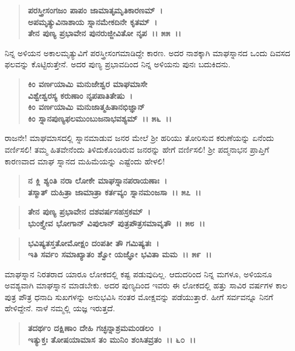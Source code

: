 \begin{verse}
\textbf{ಪರಸ್ತ್ರೀಸಂಗಜಂ ಪಾಪಂ ಜಾಮಾತೃಮೃತಿಕಾರಣಮ್~।}\\\textbf{ಅಪಮೃತ್ಯುವಿನಾಶಾಯ ಸ್ನಾನಮೇಕದಿನೇ ಕೃತಮ್~। }\\\textbf{ತೇನ ಪುಣ್ಯ ಪ್ರಭಾವೇನ ಪುನರುಜ್ಜೀವಿತೋ ನೃಪ~।। ೫೫~।।}
\end{verse}

ನಿನ್ನ ಅಳಿಯನ ಅಕಾಲಮೃತ್ಯುವಿಗೆ ಪರಸ್ತ್ರೀಸಂಗಮಾಡಿದ್ದೇ ಕಾರಣ. ಅದರ ನಾಶಕ್ಕಾಗಿ ಮಾಘಸ್ನಾನದ ಒಂದು ದಿವಸದ ಫಲವನ್ನು ಕೊಟ್ಟಿರುತ್ತೇನೆ. ಅದರ ಪುಣ್ಯ ಪ್ರಭಾವದಿಂದ ನಿನ್ನ ಅಳಿಯನು ಪುನಃ ಬದುಕಿದನು.

\begin{verse}
\textbf{ಕಿಂ ವರ್ಣಯಾಮಿ ಮನುಜೇಶ್ವರ ಮಾಘಮಾಸೇ}\\\textbf{ವಿಶ್ವೇಶ್ವರಸ್ಯ ಕರುಣಾಂ ನೃಪಪಾತಿತೇಷು~। }\\\textbf{ಕಿಂ ವರ್ಣಯಾಮಿ ಮನುಜಾತ್ಮಹಿತಾನಭಿಜ್ಞಾನ್} \\\textbf{ಕಿಂ ಸ್ನಾನಪುಣ್ಯಫಲಮುಂಬುಜನಾಭವಶ್ಯಮ್~।। ೫೬~।।}
\end{verse}

ರಾಜನೇ! ಮಾಘಮಾಸದಲ್ಲಿ ಸ್ನಾನಮಾಡುವ ಜನರ ಮೇಲೆ ಶ‍್ರೀ ಹರಿಯು ತೋರಿಸುವ ಕರುಣೆಯನ್ನು ಏನೆಂದು ವರ್ಣಿಸಲಿ! ತಮ್ಮ ಹಿತವೇನೆಂದು ತಿಳಿದುಕೊಂಡಿರುವ ಜನರನ್ನು ಹೇಗೆ ವರ್ಣಿಸಲಿ! ಶ‍್ರೀ ಪದ್ಮನಾಭನ ಪ್ರಾಪ್ತಿಗೆ ಕಾರಣವಾದ ಮಾಘ ಸ್ನಾನದ ಮಹಿಮೆಯನ್ನು ಎಷ್ಟೆಂದು ಹೇಳಲಿ!

\begin{verse}
\textbf{ನ ಕ್ಲಿ ಶ್ಯಂತಿ ನರಾ ಲೋಕೇ ಮಾಘಸ್ನಾನಪರಾಯಣಾಃ~।}\\\textbf{ತಸ್ಮಾತ್ ದುಹಿತ್ರಾ ಜಾಮಾತ್ರಾ ಕರ್ತವ್ಯಂ ಸ್ನಾನಮಂಜಸಾ~।। ೫೭~।। }
\end{verse}

\begin{verse}
\textbf{ತೇನ ಪುಣ್ಯ ಪ್ರಭಾವೇನ ದಶವರ್ಷಸಹಸ್ರಕಮ್~।}\\\textbf{ಭುಂಕ್ತ್ಯೇವ ಭೋಗಾನ್ ವಿಪುಲಾನ್ ಪುತ್ರಪೌತ್ರಸಮಾವೃತೌ~।। ೫೮~।। }
\end{verse}

\begin{verse}
\textbf{ಭವಿಷ್ಯತಸ್ತತೋಮೋಕ್ಷಂ ದಂಪತೀ ತೌ ಗಮಿಷ್ಯತಃ~।}\\\textbf{ಇತಿ ಸರ್ವಂ ಸಮಾಖ್ಯಾತಂ ಶ್ವೋ ಯಜ್ಞೋ ಭವಿತಾ ಮಮ~।। ೫೯~।।}
\end{verse}

ಮಾಘಸ್ನಾನ ನಿರತರಾದ ಯಾರೂ ಲೋಕದಲ್ಲಿ ಕಷ್ಟ ಪಡುವುದಿಲ್ಲ. ಆದುದರಿಂದ ನಿನ್ನ ಮಗಳೂ, ಅಳಿಯನೂ ಅವಶ್ಯವಾಗಿ ಮಾಘಸ್ನಾನ ಮಾಡಬೇಕು. ಅದರ ಪುಣ್ಯದಿಂದ ಇವರು ಈ ಲೋಕದಲ್ಲಿ ಹತ್ತು ಸಾವಿರ ವರ್ಷಗಳ ಕಾಲ ಪುತ್ರ ಪೌತ್ರ ಧನಾದಿ ಸುಖಗಳನ್ನು ಅನುಭವಿಸಿ ನಂತರ ಮೋಕ್ಷವನ್ನು ಪಡೆಯುತ್ತಾರೆ. ಹೀಗೆ ಸರ್ವವನ್ನೂ ನಿನಗೆ ಹೇಳಿದ್ದೇನೆ. ನಾಳೆ ನಮ್ಮಲ್ಲಿ ಯಜ್ಞ ಇರುತ್ತದೆ.

\begin{verse}
\textbf{ತದರ್ಥಂ ದಕ್ಷಿಣಾಂ ದೇಹಿ ಗಚ್ಛನ್ನಾಶ್ರಮಮಂಡಲಂ~।}\\\textbf{ಇತ್ಯುಕ್ತಃ ತೋಷಯಾಮಾಸ ತಂ ಮುನಿಂ ಶಂಸಿತವ್ರತಂ~।। ೬೦~।। }
\end{verse}

